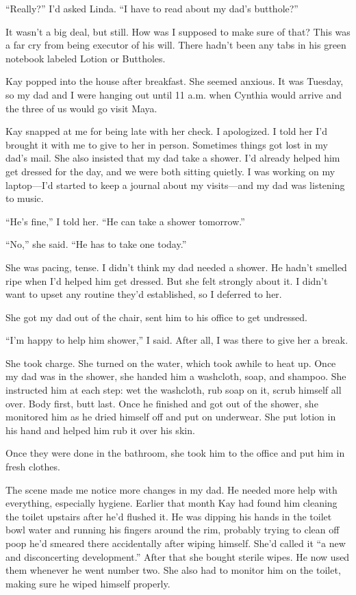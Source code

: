 \documentclass[12pt]{book}
\begin{document}
``Really?'' I'd asked Linda. ``I have to read about my dad's butthole?''

It wasn't a big deal, but still. How was I supposed to make sure of that? This was a far cry from being executor of his will. There hadn't been any tabs in his green notebook labeled Lotion or Buttholes.

Kay popped into the house after breakfast. She seemed anxious. It was Tuesday, so my dad and I were hanging out until 11 a.m. when Cynthia would arrive and the three of us would go visit Maya.

Kay snapped at me for being late with her check. I apologized. I told her I'd brought it with me to give to her in person. Sometimes things got lost in my dad's mail. She also insisted that my dad take a shower. I'd already helped him get dressed for the day, and we were both sitting quietly. I was working on my laptop---I'd started to keep a journal about my visits---and my dad was listening to music.

``He's fine,'' I told her. ``He can take a shower tomorrow.''

``No,'' she said. ``He has to take one today.''

She was pacing, tense. I didn't think my dad needed a shower. He hadn't smelled ripe when I'd helped him get dressed. But she felt strongly about it. I didn't want to upset any routine they'd established, so I deferred to her.

She got my dad out of the chair, sent him to his office to get undressed.

``I'm happy to help him shower,'' I said. After all, I was there to give her a break.

She took charge. She turned on the water, which took awhile to heat up. Once my dad was in the shower, she handed him a washcloth, soap, and shampoo. She instructed him at each step: wet the washcloth, rub soap on it, scrub himself all over. Body first, butt last. Once he finished and got out of the shower, she monitored him as he dried himself off and put on underwear. She put lotion in his hand and helped him rub it over his skin.

Once they were done in the bathroom, she took him to the office and put him in fresh clothes.

The scene made me notice more changes in my dad. He needed more help with everything, especially hygiene. Earlier that month Kay had found him cleaning the toilet upstairs after he'd flushed it. He was dipping his hands in the toilet bowl water and running his fingers around the rim, probably trying to clean off poop he'd smeared there accidentally after wiping himself. She'd called it ``a new and disconcerting development.'' After that she bought sterile wipes. He now used them whenever he went number two. She also had to monitor him on the toilet, making sure he wiped himself properly.
\end{document}
